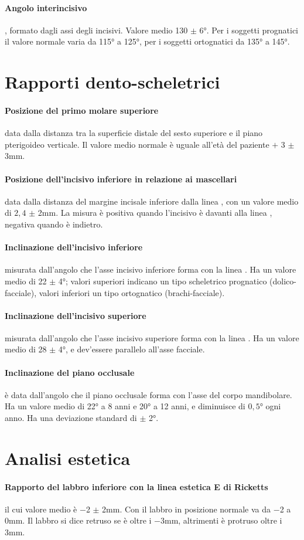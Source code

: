 \paragraph{Angolo interincisivo}, formato dagli assi degli incisivi. Valore medio 130 $\pm$ 6°. Per i soggetti prognatici il valore normale varia da 115° a 125°, per i soggetti ortognatici da 135° a 145°.

\section{Rapporti dento-scheletrici}

\paragraph{Posizione del primo molare superiore} data dalla distanza tra la superficie distale del sesto superiore e il piano pterigoideo verticale. Il valore medio normale è uguale all'età del paziente $+$ 3 $\pm$ 3mm.

\paragraph{Posizione dell'incisivo inferiore in relazione ai mascellari} data dalla distanza del margine incisale inferiore dalla linea , con un valore medio di $2,4$ $\pm$ 2mm. La misura è positiva quando l'incisivo è davanti alla linea , negativa quando è indietro.

\paragraph{Inclinazione dell'incisivo inferiore} misurata dall'angolo che l'asse incisivo inferiore forma con la linea . Ha un valore medio di 22 $\pm$ 4°; valori superiori indicano un tipo scheletrico prognatico (dolico-facciale), valori inferiori un tipo ortognatico (brachi-facciale).

\paragraph{Inclinazione dell'incisivo superiore} misurata dall'angolo che l'asse incisivo superiore forma con la linea . Ha un valore medio di 28 $\pm$ 4°, e dev'essere parallelo all'asse facciale.

\paragraph{Inclinazione del piano occlusale} è data dall'angolo che il piano occlusale forma con l'asse del corpo mandibolare. Ha un valore medio di 22° a 8 anni e 20° a 12 anni, e diminuisce di $0,5$° ogni anno. Ha una deviazione standard di $\pm$ 2°.

\section{Analisi estetica}

\paragraph{Rapporto del labbro inferiore con la linea estetica E di Ricketts} il cui valore medio è $-$2 $\pm$ 2mm. Con il labbro in posizione normale va da $-$2 a 0mm. Il labbro si dice retruso se è oltre i $-$3mm, altrimenti è protruso oltre i 3mm.
